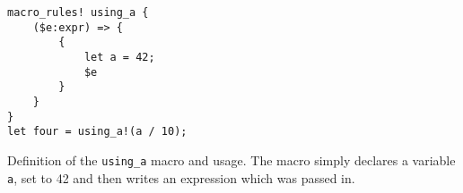 \begin{listing}
    \begin{verbatim}
macro_rules! using_a {
    ($e:expr) => {
        {
            let a = 42;
            $e
        }
    }
}
let four = using_a!(a / 10);
    \end{verbatim}
    \caption{
        Definition of the \texttt{using\_a} macro and usage.
        The macro simply declares a variable \texttt{a},
        set to 42 and then writes an expression which was passed in.
    }
    \label{lst:rust-macro-hygiene:declaration}
\end{listing}